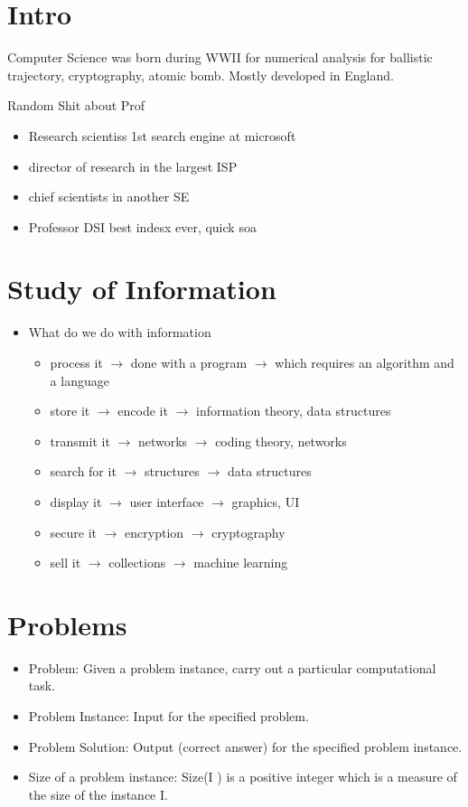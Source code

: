 \documentclass[12pt]{article}
\begin{document}
\section*{Intro}
Computer Science was born during WWII for numerical analysis for ballistic trajectory, cryptography, atomic bomb. Mostly developed in England. 

Random Shit about Prof
\begin{itemize}
\item Research scientiss 1st search engine at microsoft
\item director of research in the largest ISP
\item chief scientists in another SE
\item Professor DSI best indesx ever, quick soa
\end{itemize}


\section*{Study of Information}
\begin{itemize}
\item What do we do with information
\begin{itemize}
\item process it $\rightarrow$ done with a program $\rightarrow$ which requires an algorithm and a language
\item store it $\rightarrow$ encode it $\rightarrow$ information theory, data structures
\item transmit it $\rightarrow$ networks $\rightarrow$ coding theory, networks
\item search for it $\rightarrow$ structures $\rightarrow$ data structures
\item display it $\rightarrow$ user interface $\rightarrow$ graphics, UI
\item secure it $\rightarrow$ encryption $\rightarrow$ cryptography
\item sell it $\rightarrow$ collections $\rightarrow$ machine learning
\end{itemize}
\end{itemize}

\section*{Problems}
\begin{itemize}
\item Problem: Given a problem instance, carry out a particular computational task.
\item Problem Instance: Input for the specified problem.
\item Problem Solution: Output (correct answer) for the specified problem instance.
\item Size of a problem instance: Size(I ) is a positive integer which is a measure of the size of the instance I.
\end{itemize}
\end{document}
